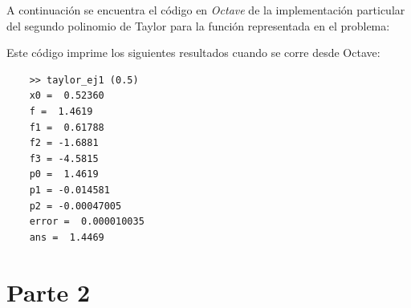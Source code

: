 \documentclass[titlepage,a4paper]{article}
\begin{document}
A continuación se encuentra el código en \emph{Octave} de la implementación particular del segundo polinomio de Taylor para la función representada en el problema:
			

Este código imprime los siguientes resultados cuando se corre desde Octave:

\begin{lstlisting}
	>> taylor_ej1 (0.5)
	x0 =  0.52360
	f =  1.4619
	f1 =  0.61788
	f2 = -1.6881
	f3 = -4.5815
	p0 =  1.4619
	p1 = -0.014581
	p2 = -0.00047005
	error =  0.000010035
	ans =  1.4469
\end{lstlisting}

\section{Parte 2}\label{sec:parte2}
\end{document}
